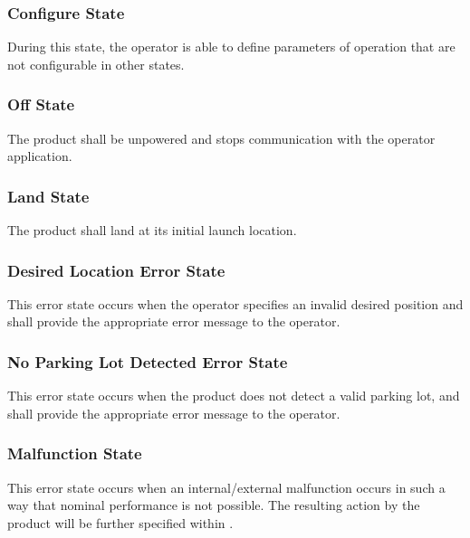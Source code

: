 \documentclass{article}
\begin{document}
\subsubsection{Configure State}
\label{Configure State}
During this state, the operator is able to define parameters of operation that are not configurable in other states. 
\subsubsection{Off State}
\label{Off State}
The product shall be unpowered and stops communication with the operator application. 
\subsubsection{Land State}
\label{Land State}
The product shall land at its initial launch location.
\subsubsection{Desired Location Error State}
\label{Desired Location Error State}
This error state occurs when the operator specifies an invalid desired position and shall provide the appropriate error message to the operator. 
\subsubsection{No Parking Lot Detected Error State}
\label{No Parking Lot Detected Error State}
This error state occurs when the product does not detect a valid parking lot, and shall provide the appropriate error message to the operator.
\subsubsection{Malfunction State}
\label{Malfunction State}
This error state occurs when an internal/external malfunction occurs in such a way that nominal performance is not possible. The resulting action by the product will be further specified within . 
\end{document}
